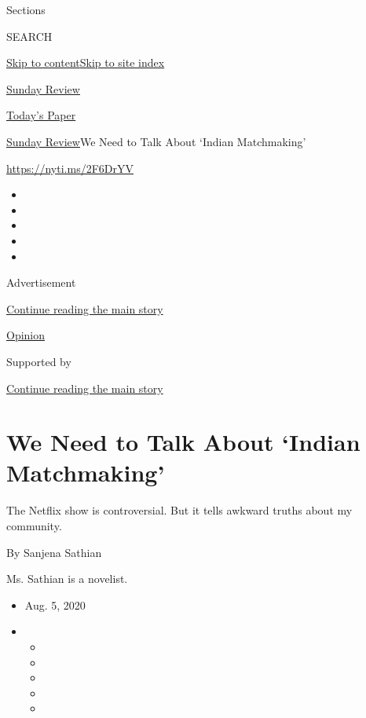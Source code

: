 Sections

SEARCH

\protect\hyperlink{site-content}{Skip to
content}\protect\hyperlink{site-index}{Skip to site index}

\href{https://www.nytimes.com/section/opinion/sunday}{Sunday Review}

\href{https://myaccount.nytimes.com/auth/login?response_type=cookie\&client_id=vi}{}

\href{https://www.nytimes.com/section/todayspaper}{Today's Paper}

\href{/section/opinion/sunday}{Sunday Review}\textbar{}We Need to Talk
About `Indian Matchmaking'

\href{https://nyti.ms/2F6DrYV}{https://nyti.ms/2F6DrYV}

\begin{itemize}
\item
\item
\item
\item
\item
\end{itemize}

Advertisement

\protect\hyperlink{after-top}{Continue reading the main story}

\href{/section/opinion}{Opinion}

Supported by

\protect\hyperlink{after-sponsor}{Continue reading the main story}

\hypertarget{we-need-to-talk-about-indian-matchmaking}{%
\section{We Need to Talk About `Indian
Matchmaking'}\label{we-need-to-talk-about-indian-matchmaking}}

The Netflix show is controversial. But it tells awkward truths about my
community.

By Sanjena Sathian

Ms. Sathian is a novelist.

\begin{itemize}
\item
  Aug. 5, 2020
\item
  \begin{itemize}
  \item
  \item
  \item
  \item
  \item
  \end{itemize}
\end{itemize}

